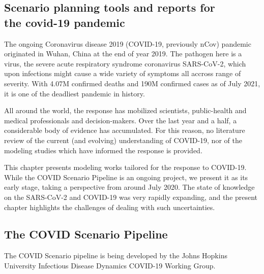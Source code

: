\begin{fullwidth}
\chapter[Scenario planning tools and reports for the covid-19 pandemic]{Scenario planning tools and reports for \\the covid-19 pandemic}
\label{sec:covid-pipeline-reports}
  \end{fullwidth}
The ongoing Coronavirus disease 2019 (COVID-19, previously nCov) pandemic originated in Wuhan, China at the end of year 2019. The pathogen here is a virus, the severe acute respiratory syndrome coronavirus SARS-CoV-2, which upon infections might cause a wide variety of symptoms all accross range of severity. With 4.07\textsc{M} confirmed deaths and 190\textsc{M} confirmed cases as of July 2021, it is one of the deadliest pandemic in history.

 All around the world, the response has mobilized scientists, public-health and medical professionals and decision-makers. Over the last year and a half, a considerable body of evidence has accumulated. For this reason, no literature review of the current (and evolving) understanding of COVID-19, nor of the modeling studies which have informed the response is provided. 

 This chapter presents modeling works tailored for the response to COVID-19. While the COVID Scenario Pipeline is an ongoing project, we present it as its early stage, taking a perspective from around July 2020. The state of knowledge on the SARS-CoV-2 and COVID-19 was very rapidly expanding, and the present chapter highlights the challenges of dealing with such uncertainties. 

\vspace{\baselineskip}
\section{The COVID Scenario Pipeline}

The COVID Scenario pipeline is being developed by the Johns Hopkins University Infectious Disease Dynamics COVID-19 Working Group. 

